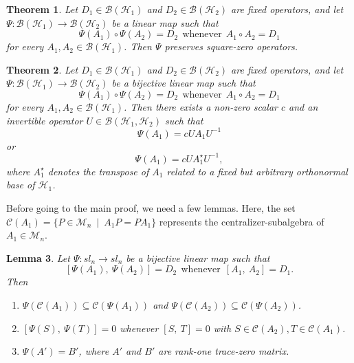 \documentclass{amsart}
\newtheorem{theorem}{Theorem}[section]
\newtheorem{lemma}[theorem]{Lemma}
\theoremstyle{definition}
\theoremstyle{remark}
\numberwithin{equation}{section}
\begin{document}
\begin{theorem}
    \label{th3}
	Let $D_1 \in \mathscr{B}(\mathscr{H}_1)$ and $D_2 \in \mathscr{B}(\mathscr{H}_2)$ are fixed operators, and let $\Psi : \mathscr{B}(\mathscr{H}_1) \to \mathscr{B}(\mathscr{H}_2)$ be a linear map such that $$\Psi(A_1) \circ \Psi(A_2)=D_2 ~~\text{whenever}~~ A_1 \circ A_2=D_1$$ for every $A_1,A_2 \in \mathscr{B}(\mathscr{H}_1)$. Then $\Psi$ preserves square-zero operators.
\end{theorem}

\begin{theorem}
\label{th4}
    Let $D_1 \in \mathscr{B}(\mathscr{H}_1)$ and $D_2 \in \mathscr{B}(\mathscr{H}_2)$ are fixed operators, and let $\Psi : \mathscr{B}(\mathscr{H}_1) \to \mathscr{B}(\mathscr{H}_2)$ be a bijective linear map such that $$\Psi(A_1) \circ \Psi(A_2)=D_2 ~~\text{whenever}~~ A_1 \circ A_2=D_1$$ for every $A_1,A_2 \in \mathscr{B}(\mathscr{H}_1)$. Then there exists a non-zero scalar $c$ and an invertible operator $U \in \mathscr{B}(\mathscr{H}_1, \mathscr{H}_2)$ such that $$\Psi(A_1)=cUA_1U^{-1}$$ or $$\Psi(A_1)=cUA_1^\star U^{-1},$$ where $A_1^\star$ denotes the transpose of $A_1$ related to a fixed but arbitrary orthonormal base of $\mathscr{H}_1$.
\end{theorem}

Before going to the main proof, we need a few lemmas. Here, the set $\mathcal{C}(A_1) = \{P\in \mathscr{M}_n~\mid~ A_1P=PA_1\}$ represents the centralizer-subalgebra of $A_1 \in \mathscr{M}_n$.
\begin{lemma}
	\label{lem1}
    Let $\Psi : sl_n \to sl_n$ be a bijective linear map such that
    \begin{equation}
    \label{eq1}
        [\Psi(A_1),~\Psi(A_2)]=D_2 ~~\text{whenever}~~ [A_1,~A_2]=D_1.
    \end{equation}
    Then
    \begin{enumerate}
      \item  $\Psi(\mathcal{C}(A_1)) \subseteq \mathcal{C}(\Psi(A_1))$ and $\Psi(\mathcal{C}(A_2)) \subseteq \mathcal{C}(\Psi(A_2))$.
      \item  $[\Psi(S),~\Psi(T)]=0$ whenever $[S,~T]=0$ with $S \in \mathcal{C}(A_2), T \in \mathcal{C}(A_1)$.
      \item  $\Psi(A')=B'$, where $A'$ and $B'$ are rank-one trace-zero matrix.
    \end{enumerate}
\end{lemma}
\end{document}
